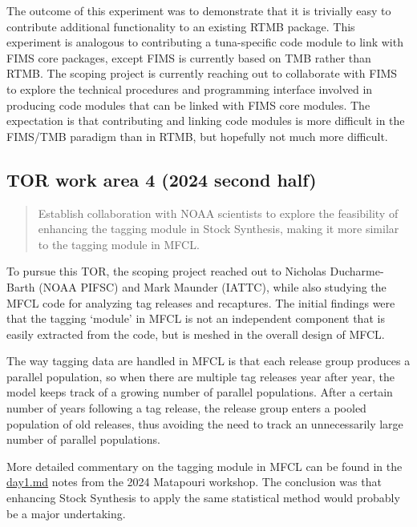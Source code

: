 \documentclass{SCreport}
\newcommand\blob
{https://github.com/PacificCommunity/ofp-sam-transition-plan/blob/main}
\begin{document}
The outcome of this experiment was to demonstrate that it is trivially easy to
contribute additional functionality to an existing RTMB package. This experiment
is analogous to contributing a tuna-specific code module to link with FIMS core
packages, except FIMS is currently based on TMB rather than RTMB. The scoping
project is currently reaching out to collaborate with FIMS to explore the
technical procedures and programming interface involved in producing code
modules that can be linked with FIMS core modules. The expectation is that
contributing and linking code modules is more difficult in the FIMS/TMB paradigm
than in RTMB, but hopefully not much more difficult.

\vspace{0ex}

\subsection{TOR work area 4 (2024 second half)}

\begin{quote}\sf
  Establish collaboration with NOAA scientists to explore the feasibility of
  enhancing the tagging module in Stock Synthesis, making it more similar to the
  tagging module in MFCL.
\end{quote}

\vspace{0.5ex}

To pursue this TOR, the scoping project reached out to Nicholas Ducharme-Barth
(NOAA PIFSC) and Mark Maunder (IATTC), while also studying the MFCL code for
analyzing tag releases and recaptures. The initial findings were that the
tagging `module' in MFCL is not an independent component that is easily
extracted from the code, but is meshed in the overall design of MFCL.

The way tagging data are handled in MFCL is that each release group produces a
parallel population, so when there are multiple tag releases year after year,
the model keeps track of a growing number of parallel populations. After a
certain number of years following a tag release, the release group enters a
pooled population of old releases, thus avoiding the need to track an
unnecessarily large number of parallel populations.

More detailed commentary on the tagging module in MFCL can be found in the
\href{\blob/workshops/2024-08-matapouri/notes/day1.md}{day1.md} notes from the
2024 Matapouri workshop. The conclusion was that enhancing Stock Synthesis to
apply the same statistical method would probably be a major undertaking.
\end{document}
